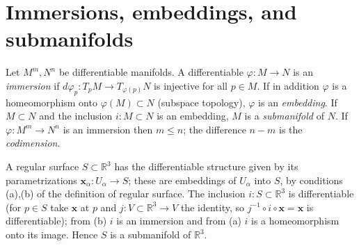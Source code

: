 \section{Immersions, embeddings, and submanifolds}

\begin{definition}
  \label{def:dc-ch0-3-1}
  \leanok
  Let $M^m,N^n$ be differentiable manifolds. A differentiable $\varphi:M\to N$ is an
  \emph{immersion} if $d\varphi_p:T_pM\to T_{\varphi(p)}N$ is injective for all $p\in M$.
  If in addition $\varphi$ is a homeomorphism onto $\varphi(M)\subset N$ (subspace
  topology), $\varphi$ is an \emph{embedding}. If $M\subset N$ and the inclusion
  $i:M\subset N$ is an embedding, $M$ is a \emph{submanifold} of $N$. If $\varphi:M^m\to
  N^n$ is an immersion then $m\le n$; the difference $n-m$ is the \emph{codimension}.
\end{definition}

\begin{example}
  \label{ex:dc-ch0-3-6}
  \notready
  A regular surface $S\subset\mathbb{R}^3$ has the differentiable structure given by
  its parametrizations $\mathbf{x}_\alpha:U_\alpha\to S$; these are embeddings of
  $U_\alpha$ into $S$, by conditions (a),(b) of the definition of regular surface.
  The inclusion $i:S\subset\mathbb{R}^3$ is differentiable (for $p\in S$ take
  $\mathbf{x}$ at $p$ and $j:V\subset\mathbb{R}^3\to V$ the identity, so
  $j^{-1}\circ i\circ\mathbf{x}=\mathbf{x}$ is differentiable); from (b) $i$ is an
  immersion and from (a) $i$ is a homeomorphism onto its image. Hence $S$ is a
  submanifold of $\mathbb{R}^3$.
\end{example}

